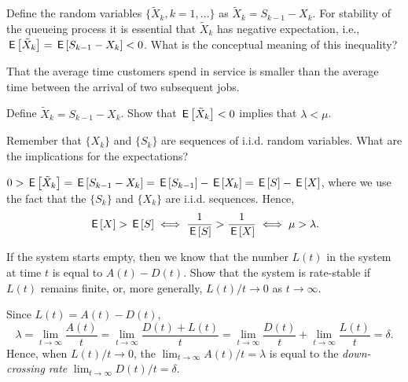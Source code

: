 \begin{extra}
Define the random variables $\{\tilde X_k,k=1,\ldots\}$ as $\tilde X_k = S_{k-1}-X_k$.
 For stability of the queueing process it is essential that
 $\tilde X_k$ has negative expectation, i.e.,
 $\,\mathsf{E}\left[\tilde X_k\right] = \,\mathsf{E}\left[S_{k-1}-X_k\right] < 0$. What is the conceptual
 meaning of this inequality?
\begin{solution}
 That the average time customers spend in service is smaller
 than the average time between the arrival of two subsequent
 jobs. 
\end{solution}
\end{extra}

\begin{exercise}
Define $\tilde X_k = S_{k-1}-X_k$.
 Show that $\,\mathsf{E}\left[\tilde X_k\right] <0$ implies that $\lambda<\mu$. 
\begin{hint}
Remember that $\{X_k\}$ and $\{S_k\}$ are sequences of i.i.d. random variables. What are the implications for the expectations?
\end{hint}
\begin{solution}
 $0> \,\mathsf{E}\left[\tilde X_k\right] = \,\mathsf{E}\left[S_{k-1}-X_k\right] = \,\mathsf{E}\left[ S_{k-1}\right]- \,\mathsf{E}\left[X_k\right] = \,\mathsf{E}\left[S\right] - \,\mathsf{E}\left[X\right]$, where we use the fact that the $\{S_k\}$ and $\{X_k\}$ are i.i.d. sequences. Hence, 
 \begin{equation*}
 \,\mathsf{E}\left[X\right] > \,\mathsf{E}\left[S\right] \iff \frac 1{\,\mathsf{E}\left[S\right]} > \frac1{\,\mathsf{E}\left[X\right]} \iff \mu > \lambda.
 \end{equation*}

\end{solution}
\end{exercise}





\begin{exercise}
If the system starts empty, then we know that the number $L(t)$ in the system at time $t$ is equal to $A(t) - D(t)$.
Show that the system is rate-stable  if $L(t)$ remains finite, or, more generally, $L(t)/t \to 0$ as $t\to\infty$.

\begin{solution}
Since $L(t) = A(t) - D(t)$, 
\begin{equation*}
 \lambda = \lim_{t \to \infty} \frac{A(t)}t = \lim_{t \to \infty} \frac{D(t)+L(t)}t = \lim_{t \to \infty} \frac{D(t)}t + \lim_{t \to \infty} \frac{L(t)}t 
 = \delta. 
\end{equation*}
Hence, when $L(t)/t\to0$, the  $\lim_{t \to \infty} A(t)/t = \lambda$ is equal to the \emph{down-crossing rate} $\lim_{t \to \infty} D(t)/t = \delta$.
\end{solution}
\end{exercise}


